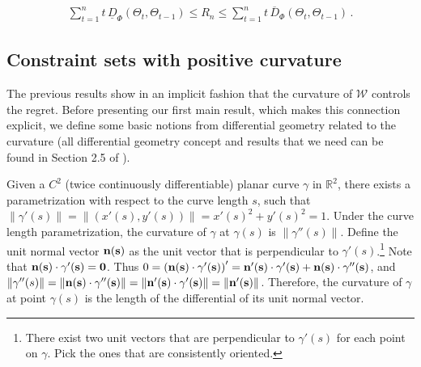 \documentclass[english]{article}
\newcommand{\cW}{\mathcal{W}}
\newcommand{\real}{\mathbb{R}}
\newcommand{\uD}{\overline{D}}
\newcommand{\lD}{\underline{D}}
\newtheorem{prop}[thm]{Proposition}
\begin{document}
\begin{align}
\label{eq:regreteq_alt}
\sum_{t=1}^{n} t\,\lD_{\Phi}(\Theta_t,\Theta_{t-1})
\le
R_n 
\le \sum_{t=1}^{n} t\,\uD_{\Phi}(\Theta_t,\Theta_{t-1})\,.
\end{align}

\subsection{Constraint sets with positive curvature}
The previous results show in an implicit fashion that the curvature of $\cW$ controls the regret. Before presenting our first main result, which makes this connection explicit, we define some basic notions from differential geometry related to the curvature (all differential geometry concept and results that we need can be found in Section 2.5 of \citealp{Sch14:ConvexBodies}).

Given a $C^2$ (twice continuously differentiable) planar curve $\gamma$ in $\real^2$, there exists a parametrization with respect to the curve length $s$, such that $\|\gamma'(s)\| = \|\left(x'(s), y'(s)\right)\| = x'(s)^2 + y'(s)^2=1$. Under the curve length parametrization, the curvature of $\gamma$ at $\gamma(s)$ is $\|\gamma''(s)\|$.
Define the unit normal vector $\bf{n}(s)$ as the unit vector that is perpendicular to $\gamma'(s)$.\footnote{There exist two unit vectors that are perpendicular to $\gamma'(s)$ for each point on $\gamma$. Pick the ones that are consistently oriented.}
Note that $\bf{n}(s)\cdot \gamma'(s) = 0$. Thus $0=\left(\bf{n}(s)\cdot \gamma'(s)\right)' = \bf{n}'(s)\cdot\gamma'(s) + \bf{n}(s)\cdot \gamma''(s)$, and $\|\gamma''(s)\| = \|\bf{n}(s)\cdot \gamma''(s)\| = \|\bf{n}'(s)\cdot\gamma'(s)\| = \|\bf{n}'(s)\|$. Therefore, the curvature of $\gamma$ at point $\gamma(s)$ is the length of the differential of its unit normal vector.
 
\end{document}
